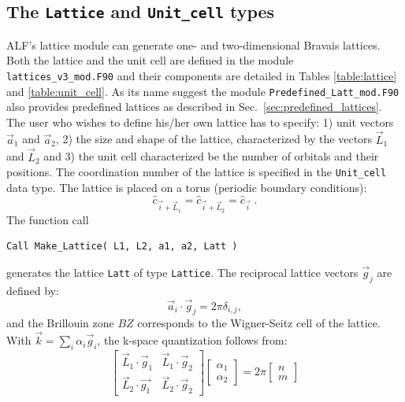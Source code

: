 \subsection{The \texttt{Lattice} and \texttt{Unit\_cell} types}\label{sec:latt}

ALF's lattice module can generate one- and two-dimensional Bravais lattices.
Both the lattice and the unit cell are defined in the module \texttt{lattices\_v3\_mod.F90} and their components are detailed in Tables \ref{table:lattice} and \ref{table:unit_cell}. 
As  its name suggest the module  \texttt{Predefined\_Latt\_mod.F90} also provides predefined lattices as  described in Sec.~\ref{sec:predefined_lattices}.
The user who wishes to define his/her own lattice has to specify: 1) unit vectors $\vec{a}_1$ and $\vec{a}_2$, 2) the size and shape of the lattice, characterized by the vectors $\vec{L}_1$ and $\vec{L}_2$ and 3) the  unit cell characterized be the number of orbitals and their positions.  The coordination number of the lattice is specified in the \texttt{Unit\_cell} data type.   The lattice is placed on a torus (periodic boundary conditions):
\begin{equation}
	\hat{c}_{\vec{i} + \vec{L}_1 }  =  \hat{c}_{\vec{i} + \vec{L}_2 }  = \hat{c}_{\vec{i}}\;.
\end{equation}
The function call 
\begin{lstlisting}[style=fortran]
Call Make_Lattice( L1, L2, a1, a2, Latt )
\end{lstlisting}
generates the lattice \texttt{Latt} of type \texttt{Lattice}.   The reciprocal lattice vectors $\vec{g}_j$ are defined by:
\begin{equation}
\label{Latt.G.eq}
	\vec{a}_i  \cdot \vec{g}_j = 2 \pi \delta_{i,j}, 
\end{equation}
and the Brillouin zone $BZ$ corresponds to the Wigner-Seitz cell of the lattice. 
With $\vec{k} = \sum_{i} \alpha_i  \vec{g}_i $, the  k-space quantization follows from: 
\begin{equation}
\begin{bmatrix}
	\vec{L}_1 \cdot \vec{g}_1  &  \vec{L}_1 \cdot \vec{g}_2  \\
	\vec{L}_2  \cdot \vec{g_1} & \vec{L}_2 \cdot  \vec{g}_2  
\end{bmatrix}
\begin{bmatrix}
   \alpha_1 \\
   \alpha_2
\end{bmatrix}
=  2 \pi 
\begin{bmatrix}
   n \\
   m
\end{bmatrix}
\end{equation}
